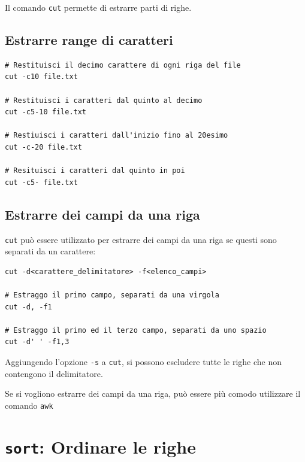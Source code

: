 \documentclass[a4paper]{report}
\newenvironment{info}{\begin{tcolorbox}[fonttitle=\sffamily\bfseries\large,title=Info,colframe=blue!75!white]}{\end{tcolorbox}}
\newenvironment{code}{\begin{tcolorbox}[size=small]}{\end{tcolorbox}}
\begin{document}
Il comando \texttt{cut} permette di estrarre parti di righe.

\subsection{Estrarre range di caratteri}

\begin{code}
\begin{lstlisting}
# Restituisci il decimo carattere di ogni riga del file
cut -c10 file.txt

# Restituisci i caratteri dal quinto al decimo
cut -c5-10 file.txt

# Restiuisci i caratteri dall'inizio fino al 20esimo
cut -c-20 file.txt

# Resituisci i caratteri dal quinto in poi
cut -c5- file.txt
\end{lstlisting}
\end{code}

\subsection{Estrarre dei campi da una riga}

\texttt{cut} può essere utilizzato per estrarre dei campi da una riga se questi sono separati da un carattere:

\begin{code}
\begin{lstlisting}
cut -d<carattere_delimitatore> -f<elenco_campi>

# Estraggo il primo campo, separati da una virgola
cut -d, -f1

# Estraggo il primo ed il terzo campo, separati da uno spazio
cut -d' ' -f1,3
\end{lstlisting}
\end{code}

\begin{info}
	Aggiungendo l'opzione \texttt{-s} a \texttt{cut}, si possono escludere tutte le righe che non contengono il delimitatore.
\end{info}

\begin{info}
	Se si vogliono estrarre dei campi da una riga, può essere più comodo utilizzare il comando \texttt{awk}
\end{info}

\section{\texttt{sort}: Ordinare le righe}
\end{document}

